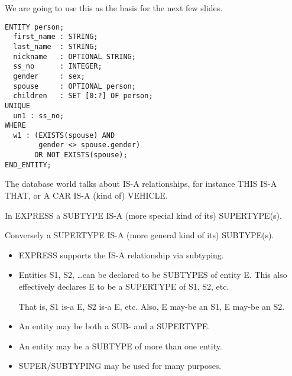 \begin{remarks}
\remintro


   We are going to use this as the basis for the next few slides.

\remend
\end{remarks}


\begin{verbatim}
ENTITY person;
  first_name : STRING;
  last_name  : STRING;
  nickname   : OPTIONAL STRING;
  ss_no      : INTEGER;
  gender     : sex;
  spouse     : OPTIONAL person;
  children   : SET [0:?] OF person;
UNIQUE
  un1 : ss_no;
WHERE
  w1 : (EXISTS(spouse) AND 
        gender <> spouse.gender)
       OR NOT EXISTS(spouse);
END_ENTITY;
\end{verbatim}

\begin{remarks}
\remintro


    The database world talks about IS-A relationships, for instance
THIS IS-A THAT, or A CAR IS-A (kind of) VEHICLE.

In EXPRESS a SUBTYPE IS-A (more special kind of its) SUPERTYPE(s).

Conversely a SUPERTYPE IS-A (more general kind of its) SUBTYPE(s).


\remend
\end{remarks}


\begin{itemize}
\item EXPRESS supports the IS-A relationship via subtyping.
\item Entities S1, S2, \ldots can be declared to be SUBTYPES of entity E.
This also effectively declares E to be a SUPERTYPE of S1, S2, etc.

That is, S1 is-a E, S2 is-a E, etc. Also, E may-be an S1, E may-be an S2.
\item An entity may be both a SUB- and a SUPERTYPE.
\item An entity may be a SUBTYPE of more than one entity.
\item SUPER/SUBTYPING may be used for many purposes.
\end{itemize}

